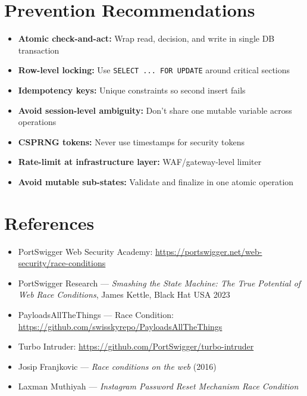 \documentclass[11pt]{article}
\begin{document}
\section{Prevention Recommendations}

\begin{itemize}
    \item \textbf{Atomic check-and-act:} Wrap read, decision, and write in single DB transaction
    \item \textbf{Row-level locking:} Use \texttt{SELECT ... FOR UPDATE} around critical sections
    \item \textbf{Idempotency keys:} Unique constraints so second insert fails
    \item \textbf{Avoid session-level ambiguity:} Don't share one mutable variable across operations
    \item \textbf{CSPRNG tokens:} Never use timestamps for security tokens
    \item \textbf{Rate-limit at infrastructure layer:} WAF/gateway-level limiter
    \item \textbf{Avoid mutable sub-states:} Validate and finalize in one atomic operation
\end{itemize}

\section{References}

\begin{itemize}
    \item PortSwigger Web Security Academy: \url{https://portswigger.net/web-security/race-conditions}
    \item PortSwigger Research — \textit{Smashing the State Machine: The True Potential of Web Race Conditions}, James Kettle, Black Hat USA 2023
    \item PayloadsAllTheThings — Race Condition: \url{https://github.com/swisskyrepo/PayloadsAllTheThings}
    \item Turbo Intruder: \url{https://github.com/PortSwigger/turbo-intruder}
    \item Josip Franjkovic — \textit{Race conditions on the web} (2016)
    \item Laxman Muthiyah — \textit{Instagram Password Reset Mechanism Race Condition}
\end{itemize}
\end{document}
